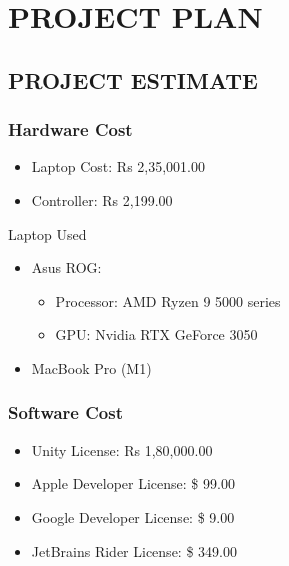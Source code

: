 \documentclass[12pt]{report}
\begin{document}
\section{PROJECT PLAN}
\justifying
\setlength{\parindent}{4em}
\setlength{\parskip}{0.5em}
\renewcommand{\baselinestretch}{1.5}

\subsection{PROJECT ESTIMATE}
\subsubsection{Hardware Cost}

\begin{itemize}
\item Laptop Cost: Rs 2,35,001.00
\item Controller:  Rs 2,199.00
\end{itemize}
Laptop Used 
\begin{itemize}
\item Asus ROG:
\begin{itemize}
\item Processor: AMD  Ryzen 9 5000 series
\item GPU: Nvidia RTX GeForce 3050
\end{itemize}
\item MacBook Pro (M1) 
\end{itemize}


\subsubsection{Software Cost}
\justifying
\setlength{\parindent}{4em}
\setlength{\parskip}{0.5em}
\renewcommand{\baselinestretch}{1.5}
\vspace{0.1cm}
\begin{itemize}
\item Unity License:   Rs 1,80,000.00
\item Apple Developer License: \$ 99.00
\item Google Developer License: \$ 9.00
\item JetBrains Rider License: \$ 349.00
\end{itemize}
\end{document}
